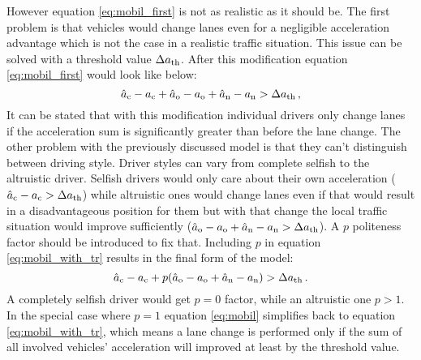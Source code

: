 			However equation \ref{eq:mobil_first} is not as realistic as it should be. The first problem is that vehicles would change lanes  even for a negligible acceleration advantage which is not the case in a realistic traffic situation. This issue can be solved with a threshold value $\Delta  a_{\rm th}$. After this modification equation \ref{eq:mobil_first} would look like below:
			\begin{equation}
				\hat{a}_{\rm c} - a_{\rm c} + \hat{a}_{\rm o} - a_{\rm o} + \hat{a}_{\rm n} - a_{\rm n} > \Delta  a_{\rm th}\,,
				\label{eq:mobil_with_tr}
			\end{equation}
			It can be stated that with this modification individual drivers only change lanes if the acceleration sum is significantly greater than before the lane change. The other problem with the previously discussed model is that they can't distinguish between driving style. Driver styles can vary from complete selfish to the altruistic driver. Selfish drivers would only care about  their own acceleration ($\hat{a}_{\rm c} - a_{\rm c} > \Delta  a_{\rm th}$) while altruistic ones would change lanes even if that would result in a disadvantageous position for them but with that change the local traffic situation would improve sufficiently ($\hat{a}_{\rm o} - a_{\rm o} + \hat{a}_{\rm n} - a_{\rm n} > \Delta  a_{\rm th}$). A $p$ politeness factor should be introduced to fix that. Including $p$ in equation \ref{eq:mobil_with_tr} results in the final form of the model:
			\begin{equation}
				\hat{a}_{\rm c} - a_{\rm c} + p(\hat{a}_{\rm o} - a_{\rm o} + \hat{a}_{\rm n} - a_{\rm n}) > \Delta  a_{\rm th}\,.
				\label{eq:mobil}
			\end{equation}
			A completely selfish driver would get $p=0$ factor, while an altruistic one $p>1$. In the special case where $p=1$ equation \ref{eq:mobil} simplifies back to equation \ref{eq:mobil_with_tr}, which means a lane change is performed only if the sum of all involved vehicles' acceleration will improved at least by the threshold value.
